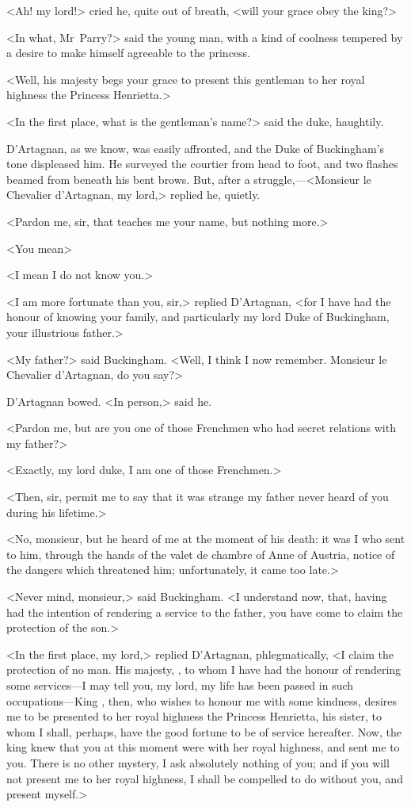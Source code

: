 <Ah! my lord!> cried he, quite out of breath, <will your grace obey the king?>

<In what, Mr~Parry?> said the young man, with a kind of coolness tempered by a desire to make himself agreeable to the princess.

<Well, his majesty begs your grace to present this gentleman to her royal highness the Princess Henrietta.>

<In the first place, what is the gentleman's name?> said the duke, haughtily.

D'Artagnan, as we know, was easily affronted, and the Duke of Buckingham's tone displeased him. He surveyed the courtier from head to foot, and two flashes beamed from beneath his bent brows. But, after a struggle,—<Monsieur le Chevalier d'Artagnan, my lord,> replied he, quietly.

<Pardon me, sir, that teaches me your name, but nothing more.>

<You mean\longdash>

<I mean I do not know you.>

<I am more fortunate than you, sir,> replied D'Artagnan, <for I have had the honour of knowing your family, and particularly my lord Duke of Buckingham, your illustrious father.>

<My father?> said Buckingham. <Well, I think I now remember. Monsieur le Chevalier d'Artagnan, do you say?>

D'Artagnan bowed. <In person,> said he.

<Pardon me, but are you one of those Frenchmen who had secret relations with my father?>

<Exactly, my lord duke, I am one of those Frenchmen.>

<Then, sir, permit me to say that it was strange my father never heard of you during his lifetime.>

<No, monsieur, but he heard of me at the moment of his death: it was I who sent to him, through the hands of the valet de chambre of Anne of Austria, notice of the dangers which threatened him; unfortunately, it came too late.>

<Never mind, monsieur,> said Buckingham. <I understand now, that, having had the intention of rendering a service to the father, you have come to claim the protection of the son.>

<In the first place, my lord,> replied D'Artagnan, phlegmatically, <I claim the protection of no man. His majesty, , to whom I have had the honour of rendering some services—I may tell you, my lord, my life has been passed in such occupations—King , then, who wishes to honour me with some kindness, desires me to be presented to her royal highness the Princess Henrietta, his sister, to whom I shall, perhaps, have the good fortune to be of service hereafter. Now, the king knew that you at this moment were with her royal highness, and sent me to you. There is no other mystery, I ask absolutely nothing of you; and if you will not present me to her royal highness, I shall be compelled to do without you, and present myself.>

